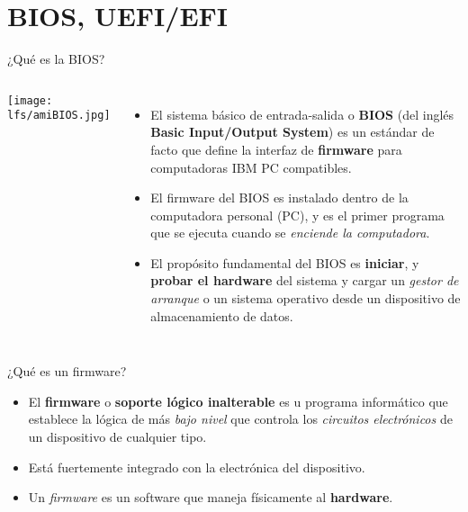 

\section{BIOS, UEFI/EFI}

\begin{frame}[c]{¿Qué es la BIOS?}
  \begin{columns}
      \begin{center}
        \texttt{[image: lfs/amiBIOS.jpg]}
      \end{center}
    \begin{itemize}
      \item El sistema básico de entrada-salida o \textbf{BIOS}
        (del inglés \textbf{Basic Input/Output System}) es un estándar de
        facto que define la interfaz de \textbf{firmware} para computadoras
        IBM PC compatibles.
      \pausa
      \item El firmware del BIOS es instalado dentro de la computadora
        personal (PC), y es el primer programa que se ejecuta cuando se
        \emph{enciende la computadora}.
      \pausa
      \item El propósito fundamental del BIOS es \textbf{iniciar}, y
        \textbf{probar el hardware} del sistema y cargar un \emph{gestor de
        arranque} o un sistema operativo desde un dispositivo de
        almacenamiento de datos.
    \end{itemize}
  \end{columns}
\end{frame}

\begin{frame}[c]{¿Qué es un firmware?}
  \begin{itemize}
    \item El \textbf{firmware} o \textbf{soporte lógico inalterable} es u
      programa informático que establece la lógica de más \emph{bajo nivel}
      que controla los \emph{circuitos electrónicos} de un dispositivo de
      cualquier tipo.
    \pausa
    \item Está fuertemente integrado con la electrónica del dispositivo.
    \pausa
    \item Un \emph{firmware} es un software que maneja físicamente al
      \textbf{hardware}.
  \end{itemize}
\end{frame}

